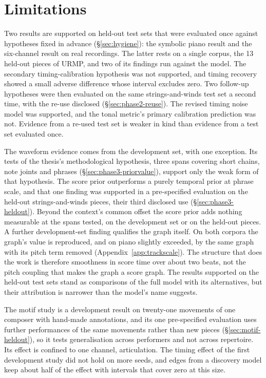 \section{Limitations}
Two results are supported on held-out test sets that were evaluated once
against hypotheses fixed in advance (\S\ref{sec:hygiene}): the symbolic
piano result and the six-channel result on real recordings. The latter rests
on a single corpus, the 13 held-out pieces of URMP, and two of its findings
run against the model. The secondary timing-calibration hypothesis was not
supported, and timing recovery showed a small adverse difference whose
interval excludes zero. Two follow-up hypotheses
were then evaluated on the same strings-and-winds test set a second time,
with the re-use disclosed (\S\ref{sec:phase2-reuse}). The revised timing
noise model was supported, and the tonal metric's primary calibration
prediction was not. Evidence from a re-used test set is weaker in kind than
evidence from a test set evaluated once.

The waveform evidence comes from the development set, with one exception.
Its tests of the thesis's methodological hypothesis, three spans
covering short chains, note joints and phrases
(\S\ref{sec:phase3-priorvalue}), support only the weak form of that
hypothesis. The score prior outperforms a purely temporal prior at phrase
scale, and that one finding was supported in a pre-specified evaluation
on the held-out strings-and-winds pieces, their third disclosed use
(\S\ref{sec:phase3-heldout}). Beyond the context's common offset the
score prior adds nothing measurable at the spans tested, on the
development set or on the held-out pieces. A further development-set finding qualifies the graph
itself. On both corpora the graph's value is reproduced, and on piano
slightly exceeded, by the same graph with its pitch term removed
(Appendix~\ref{app:trackscale}). The structure that does the work is
therefore smoothness in score time over about two beats, not the pitch
coupling that makes the graph a score graph. The results supported on the
held-out test sets stand as comparisons of the full model with its
alternatives, but their attribution is narrower than the model's name
suggests.

The motif study is a development result on twenty-one movements of one
composer with hand-made annotations, and its one pre-specified evaluation
uses further performances of the same movements rather than new pieces
(\S\ref{sec:motif-heldout}), so it tests generalisation across performers
and not across repertoire. Its effect is confined to one channel,
articulation. The timing effect of the first development study did not
hold on more seeds, and edges from a discovery model keep about half of
the effect with intervals that cover zero at this size.

